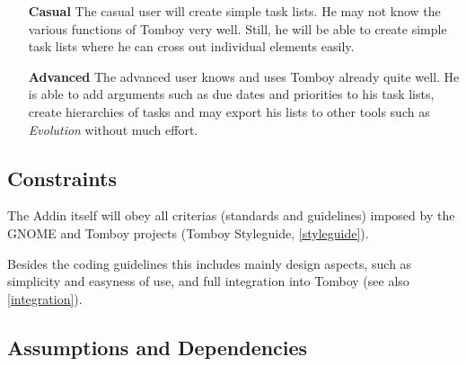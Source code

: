   \begin{itemize}
    \item[\bf{Casual}] The casual user will create simple task lists. He may not know the various functions of Tomboy very well. Still, he will be able to create simple task lists where he can cross out individual elements easily.

    \item[\bf{Advanced}] The advanced user knows and uses Tomboy already quite well. He is able to add arguments such as due dates and priorities to his task lists, create hierarchies of tasks and may export his lists to other tools such as \textit{Evolution} without much effort.

  \end{itemize}


\subsection{Constraints}
\label{description:constraints}
The Addin itself will obey all criterias (standards and guidelines) imposed by the GNOME and Tomboy projects (Tomboy Styleguide, \ref{styleguide}).

Besides the coding guidelines this includes mainly design aspects, such as simplicity and easyness of use, and full integration into Tomboy (see also \ref{integration}).


\subsection{Assumptions and Dependencies}
\label{description:assumptions}

